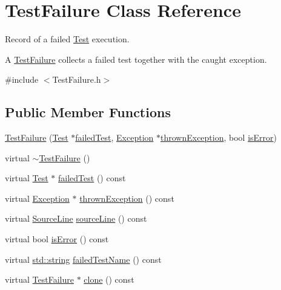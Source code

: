 \hypertarget{class_test_failure}{\section{Test\-Failure Class Reference}
\label{class_test_failure}
}


Record of a failed \hyperlink{class_test}{Test} execution.

A \hyperlink{class_test_failure}{Test\-Failure} collects a failed test together with the caught exception.  




{\ttfamily \#include $<$Test\-Failure.\-h$>$}

\subsection*{Public Member Functions}
\begin{DoxyCompactItemize}
\item 
\hyperlink{class_test_failure_a0ecf7ad4ab673974d30d10ffb2b01790}{Test\-Failure} (\hyperlink{class_test}{Test} $\ast$\hyperlink{class_test_failure_a35aa1b953feff8635c832a53d3c6946d}{failed\-Test}, \hyperlink{class_exception}{Exception} $\ast$\hyperlink{class_test_failure_a8e60e0c1ea068bef6c546d20d8260400}{thrown\-Exception}, bool \hyperlink{class_test_failure_a23b25cf3452b3ab7dc84c70664f13ff0}{is\-Error})
\item 
virtual \hyperlink{class_test_failure_a000c058419a8177d64d1019c6c2f624d}{$\sim$\-Test\-Failure} ()
\item 
virtual \hyperlink{class_test}{Test} $\ast$ \hyperlink{class_test_failure_a35aa1b953feff8635c832a53d3c6946d}{failed\-Test} () const 
\item 
virtual \hyperlink{class_exception}{Exception} $\ast$ \hyperlink{class_test_failure_a8e60e0c1ea068bef6c546d20d8260400}{thrown\-Exception} () const 
\item 
virtual \hyperlink{class_source_line}{Source\-Line} \hyperlink{class_test_failure_aa3c6a076dca224d7e440212cfd127305}{source\-Line} () const 
\item 
virtual bool \hyperlink{class_test_failure_a23b25cf3452b3ab7dc84c70664f13ff0}{is\-Error} () const 
\item 
virtual \hyperlink{glew_8h_ae84541b4f3d8e1ea24ec0f466a8c568b}{std\-::string} \hyperlink{class_test_failure_aca471a29c01d3c5e4d439aadbb1825bf}{failed\-Test\-Name} () const 
\item 
virtual \hyperlink{class_test_failure}{Test\-Failure} $\ast$ \hyperlink{class_test_failure_a0f0c86f12431ea8adde3e70e0cb52db7}{clone} () const 
\end{DoxyCompactItemize}
